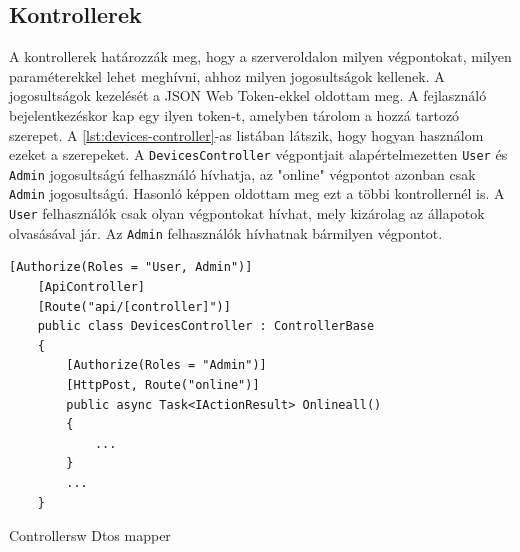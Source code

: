 \subsection{Kontrollerek}
A kontrollerek határozzák meg, hogy a szerveroldalon milyen végpontokat, milyen paraméterekkel lehet meghívni, ahhoz milyen jogosultságok kellenek.
A jogosultságok kezelését a JSON Web Token-ekkel oldottam meg. A fejlasználó bejelentkezéskor kap egy ilyen token-t, 
amelyben tárolom a hozzá tartozó szerepet. A \ref{lst:devices-controller}-as listában látszik, hogy hogyan használom ezeket a szerepeket.
A \verb+DevicesController+ végpontjait alapértelmezetten \verb+User+ és \verb+Admin+ jogosultságú felhasználó hívhatja, az "online" végpontot azonban csak \verb+Admin+ jogosultságú.
Hasonló képpen oldottam meg ezt a többi kontrollernél is. A \verb+User+ felhasználók csak olyan végpontokat hívhat, mely kizárolag az állapotok olvasásával jár.
Az \verb+Admin+ felhasználók hívhatnak bármilyen végpontot.

\begin{lstlisting}[caption=Az eszköz kontroller és annak "online" végpontja, label=lst:devices-controller]
    [Authorize(Roles = "User, Admin")]
    [ApiController]
    [Route("api/[controller]")]
    public class DevicesController : ControllerBase
    {
        [Authorize(Roles = "Admin")]
        [HttpPost, Route("online")]
        public async Task<IActionResult> Onlineall()
        {
            ...
        }
        ...
    }
\end{lstlisting}

Controllersw
Dtos
mapper